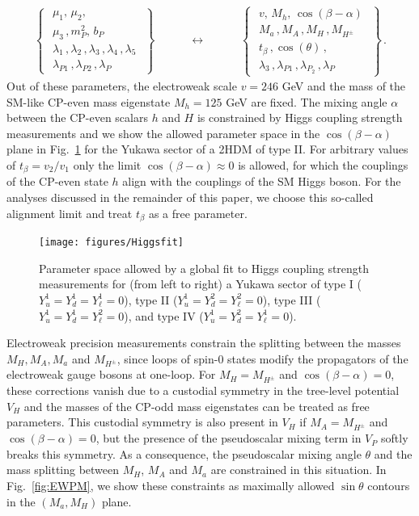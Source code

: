 \begin{align}
\left\{ \,\,\begin{matrix}
\mu_1,\,\mu_2,\\[3pt]
\mu_3\,, m_P^2,\, b_P\\[3pt]
\lambda_1\,,\lambda_2\,,\lambda_3\,,\lambda_4\,,\lambda_5\\
\lambda_{P1}\,,\lambda_{P2} \,, \lambda_P
\end{matrix}\,\,\right\}\qquad \quad \longleftrightarrow \quad \qquad \left\{ \,\,\begin{matrix}
v,\, M_h,\,\cos(\beta-\alpha)\\[3pt]
M_a\,, M_A\,, M_H\,,M_{H^\pm}\\[3pt]
t_\beta\,, \cos(\theta)\,, \\[3pt]
\lambda_3\,,\lambda_{P1}\,,\lambda_{P_2}\,,\lambda_P
\end{matrix}\,\,\right\}\,.
\end{align}
Out of these parameters, the electroweak scale $v=246$ GeV and the mass of the SM-like CP-even mass eigenstate $M_h=125$ GeV are fixed. The mixing angle $\alpha$ between the CP-even scalars $h$ and $H$ is constrained by Higgs coupling strength measurements \cite{} and we show the allowed parameter space in the $\cos(\beta-\alpha)$ plane in  Fig.~\ref{fig:higgsfit} for the Yukawa sector of a 2HDM of type II.  For arbitrary values of $t_\beta=v_2/v_1$ only the limit $\cos(\beta-\alpha)\approx 0$ is allowed, for which the couplings of the CP-even state $h$ align with the couplings of the SM Higgs boson. For the analyses discussed in the remainder of this paper, we choose this so-called alignment limit and treat $t_\beta$ as a free parameter.
\begin{figure}[t]
\texttt{[image: figures/Higgsfit]}
\caption{\label{fig:higgsfit} Parameter space allowed by a global fit to Higgs coupling strength measurements for (from left to right) a Yukawa sector of type I ($Y_u^1  = Y_d^1 = Y_\ell^1 =0$), type II ($Y_u^1 = Y_d^2 = Y_\ell^2 =0$),  type III ($Y_u^1 = Y_d^1 = Y_\ell^2 =0$), and type IV ($Y_u^1  = Y_d^2 = Y_\ell^1 =0$). }
\end{figure}
Electroweak precision measurements constrain the splitting between the masses $M_H, M_A, M_a$ and $M_{H^\pm}$, since loops of spin-0 states modify the propagators of the electroweak gauge bosons at one-loop. For $M_H=M_{H^\pm}$ and $\cos(\beta-\alpha)=0$, these corrections vanish due to a custodial symmetry in the tree-level potential $V_H$ \cite{} and the masses of the CP-odd mass eigenstates can be treated as free parameters. This custodial symmetry is also present in $V_H$ if $M_A=M_{H^\pm}$ and $\cos(\beta-\alpha)=0$, but the presence of the pseudoscalar mixing term in $V_P$ softly breaks this symmetry. As a consequence, the pseudoscalar mixing angle $\theta$ and the mass splitting between $M_H$, $M_A$ and $M_a$ are constrained in this situation. In Fig.~\ref{fig:EWPM}, we show these constraints as maximally allowed $\sin \theta$ contours in the $(M_a, M_H)$ plane.
